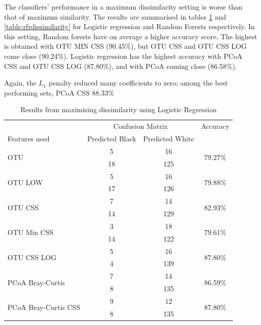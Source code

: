 The classifiers' performance in a maximum dissimilarity setting is worse than that of maximum similarity. The results are summarised in tables \ref{table:lrdissimilarity} and \ref{table:rfrdissimilarity} for Logistic regression and Random Forests respectively. In this setting, Random forests have on average a higher accuracy score. The highest is obtained with OTU MIN CSS (90.45\%), but OTU CSS and OTU CSS LOG come close (90.24\%). Logistic regression has the highest accuracy with PCoA CSS and OTU CSS LOG (87.80\%), and with PCoA coming close (86.58\%).

Again, the $L_1$ penalty reduced many coefficients to zero; among the best performing sets, PCoA CSS 88.33\%   
\begin{table}[h]
	\centering
	\begin{tabular}{l c  c c}
		\toprule
		&\multicolumn{2}{c}{Confusion Matrix} & Accuracy\\
		Features used & Predicted Black&Predicted White&\\
		\midrule
		\multirow{2}{*}{OTU} &5 &16&\multirow{2}{*}{79.27\%}\\
		&	 18&125&\\
		\cmidrule{2-3}
		\multirow{2}{*}{OTU LOW} &5 &16&\multirow{2}{*}{79.88\%}\\
		&	 17&126&\\
		\cmidrule{2-3}
		\multirow{2}{*}{OTU CSS}&7 &14&\multirow{2}{*}{82.93\%}\\
		&	 14&129&\\
		\cmidrule{2-3}
		\multirow{2}{*}{OTU Min CSS}&3 &18&\multirow{2}{*}{79.61\%}\\
		&	 14&122&\\
		\cmidrule{2-3}
		\multirow{2}{*}{OTU CSS LOG}&5 &16&\multirow{2}{*}{87.80\%}\\
		&	 4&139&\\
		\cmidrule{2-3}
		\multirow{2}{*}{PCoA Bray-Curtis} &7 &14&\multirow{2}{*}{86.59\%}\\
		&	 8&135&\\
		\cmidrule{2-3}
		\multirow{2}{*}{PCoA Bray-Curtis CSS} &9 &12&\multirow{2}{*}{87.80\%}\\
		&	 8&135&\\
		\bottomrule
	\end{tabular}
	\caption{Results from maximising dissimilarity using Logistic Regression}
	\label{table:lrdissimilarity}
\end{table}



